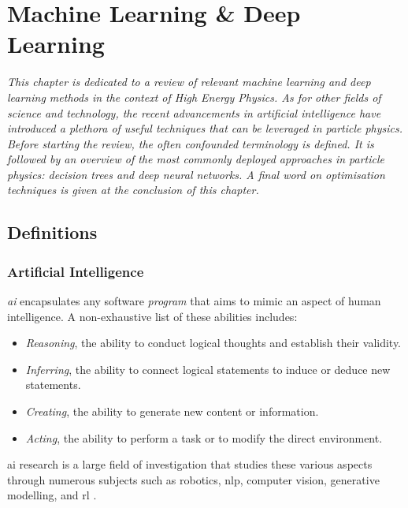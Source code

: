 \chapter{\color{oxfordblue} Machine Learning \& Deep Learning}\label{Chap-ML}
\ChapFrame

\textit{
This chapter is dedicated to a review of relevant machine learning and deep learning methods in the context of High Energy Physics. As for other fields of science and technology, the recent advancements in artificial intelligence have introduced a plethora of useful techniques that can be leveraged in particle physics. Before starting the review, the often confounded terminology is defined. It is followed by an overview of the most commonly deployed approaches in particle physics: decision trees and deep neural networks. A final word on optimisation techniques is given at the conclusion of this chapter.
}

\section{Definitions}
\subsection{Artificial Intelligence}
\textit{\gls{ai}} encapsulates any software \textit{program} that aims to mimic an aspect of human intelligence. A non-exhaustive list of these abilities includes: 
\begin{itemize}
    \item \textit{Reasoning}, the ability to conduct logical thoughts and establish their validity.
    \item \textit{Inferring}, the ability to connect logical statements to induce or deduce new statements.
    \item \textit{Creating}, the ability to generate new content or information. 
    \item \textit{Acting}, the ability to perform a task or to modify the direct environment.
\end{itemize}
\gls{ai} research is a large field of investigation that studies these various aspects through numerous subjects such as robotics, \gls{nlp}, computer vision, generative modelling, and \gls{rl} \cite{russel2010}. \\

